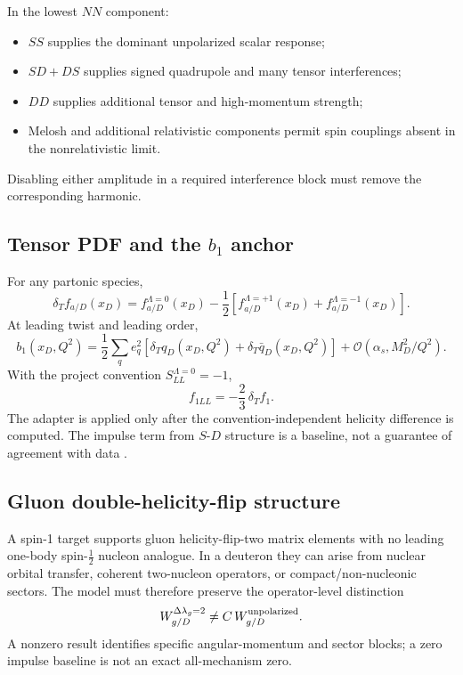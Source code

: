\documentclass[11pt]{article}
\newcommand{\cO}{\mathcal O}
\begin{document}
In the lowest \(NN\) component:
\begin{itemize}
\item \(SS\) supplies the dominant unpolarized scalar response;
\item \(SD+DS\) supplies signed quadrupole and many tensor interferences;
\item \(DD\) supplies additional tensor and high-momentum strength;
\item Melosh and additional relativistic components permit spin couplings
      absent in the nonrelativistic limit.
\end{itemize}
Disabling either amplitude in a required interference block must remove the
corresponding harmonic.

\subsection{Tensor PDF and the \texorpdfstring{\(b_1\)}{b1} anchor}

For any partonic species,
\begin{equation}
 \delta_T f_{a/D}(x_D)
 =f_{a/D}^{\Lambda=0}(x_D)
 -\frac12\left[
 f_{a/D}^{\Lambda=+1}(x_D)
 +f_{a/D}^{\Lambda=-1}(x_D)
 \right].
\label{eq:tensor-pdf-definition}
\end{equation}
At leading twist and leading order,
\begin{equation}
 b_1(x_D,Q^2)
 =\frac12\sum_q e_q^2
 \left[
 \delta_T q_D(x_D,Q^2)
 +\delta_T\bar q_D(x_D,Q^2)
 \right]
 +\cO(\alpha_s,M_D^2/Q^2).
\label{eq:b1-relation}
\end{equation}
With the project convention \(S_{LL}^{\Lambda=0}=-1\),
\begin{equation}
 f_{1LL}=-\frac23\,\delta_T f_1.
\label{eq:f1ll-tensor-adapter}
\end{equation}
The adapter is applied only after the convention-independent helicity
difference is computed.  The impulse term from \(S\)-\(D\) structure is a
baseline, not a guarantee of agreement with data
\cite{HoodbhoyJaffeManohar1989,HERMES2005,CosynDongKumanoSargsian2017}.

\subsection{Gluon double-helicity-flip structure}

A spin-1 target supports gluon helicity-flip-two matrix elements with no
leading one-body spin-\(\tfrac12\) nucleon analogue.  In a deuteron they can
arise from nuclear orbital transfer, coherent two-nucleon operators, or
compact/non-nucleonic sectors.  The model must therefore preserve the
operator-level distinction
\begin{equation}
 W_{g/D}^{\Delta\lambda_g=2}
 \neq
 C\,W_{g/D}^{\rm unpolarized}.
\label{eq:gluon-transversity-not-rescaling}
\end{equation}
A nonzero result identifies specific angular-momentum and sector blocks; a
zero impulse baseline is not an exact all-mechanism zero.
\end{document}
